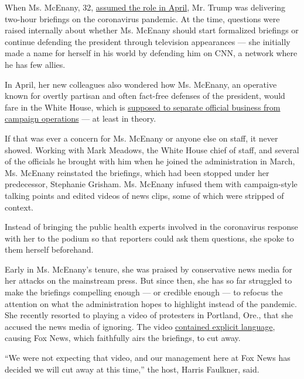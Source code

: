 When Ms. McEnany, 32,
\href{https://www.nytimes.com/2020/04/07/us/politics/kayleigh-mcenany-stephanie-grisham-trump.html}{assumed
the role in April}, Mr. Trump was delivering two-hour briefings on the
coronavirus pandemic. At the time, questions were raised internally
about whether Ms. McEnany should start formalized briefings or continue
defending the president through television appearances --- she initially
made a name for herself in his world by defending him on CNN, a network
where he has few allies.

In April, her new colleagues also wondered how Ms. McEnany, an operative
known for overtly partisan and often fact-free defenses of the
president, would fare in the White House, which is
\href{https://www.nytimes.com/2020/07/16/us/politics/trump-goya-ivanka.html}{supposed
to separate official business from campaign operations} --- at least in
theory.

If that was ever a concern for Ms. McEnany or anyone else on staff, it
never showed. Working with Mark Meadows, the White House chief of staff,
and several of the officials he brought with him when he joined the
administration in March, Ms. McEnany reinstated the briefings, which had
been stopped under her predecessor, Stephanie Grisham. Ms. McEnany
infused them with campaign-style talking points and edited videos of
news clips, some of which were stripped of context.

Instead of bringing the public health experts involved in the
coronavirus response with her to the podium so that reporters could ask
them questions, she spoke to them herself beforehand.

Early in Ms. McEnany's tenure, she was praised by conservative news
media for her attacks on the mainstream press. But since then, she has
so far struggled to make the briefings compelling enough --- or credible
enough --- to refocus the attention on what the administration hopes to
highlight instead of the pandemic. She recently resorted to playing a
video of protesters in Portland, Ore., that she accused the news media
of ignoring. The video
\href{https://twitter.com/alexnazaryan/status/1286718175506178048?ref_src=twsrc\%5Etfw\%7Ctwcamp\%5Etweetembed\%7Ctwterm\%5E1286718175506178048\%7Ctwgr\%5E\&ref_url=https\%3A\%2F\%2Fwww.businessinsider.com\%2Ffox-news-cut-away-from-disturbing-portland-video-wh-briefing-2020-7}{contained
explicit language}, causing Fox News, which faithfully airs the
briefings, to cut away.

``We were not expecting that video, and our management here at Fox News
has decided we will cut away at this time,'' the host, Harris Faulkner,
said.


